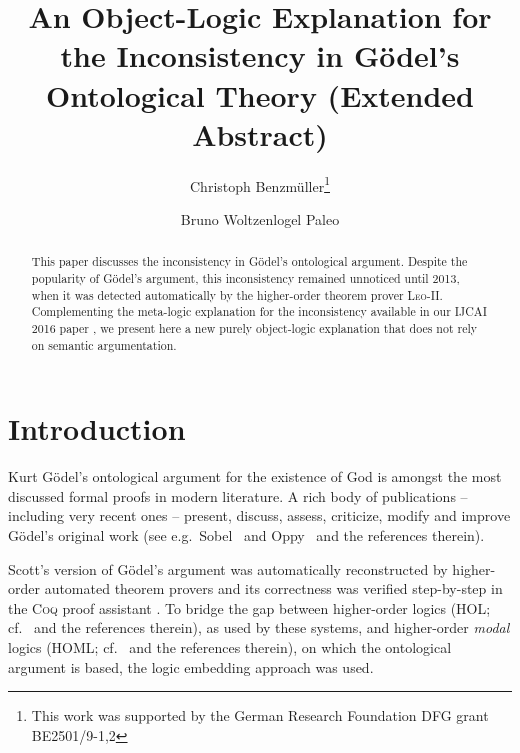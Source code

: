 \documentclass{llncs}
\begin{document}
\title{An Object-Logic Explanation for the Inconsistency in G\"odel's
  Ontological Theory (Extended Abstract)}
\author{Christoph Benzm\"uller\thanks{This work was supported by
    the German Research Foundation DFG grant BE2501/9-1,2} \and Bruno Woltzenlogel Paleo 
}


\maketitle            



\begin{abstract}
  This paper discusses the 
  inconsistency in G\"odel's
  ontological argument. Despite the popularity of G\"odel's argument, this
  inconsistency remained unnoticed until 2013, 
  when it was detected automatically by the 
  higher-order theorem prover \textsc{Leo-II}. Complementing the meta-logic explanation for the inconsistency available in our IJCAI 2016 paper \cite{C55}, we present here a new purely object-logic explanation that does not rely on semantic argumentation.
  
\end{abstract}



\section{Introduction}\label{sec:introduction}
Kurt G\"{o}del's ontological
argument for the existence of God \cite{GoedelNotes,ScottNotes} is
amongst the most discussed formal proofs in modern literature. A rich
body of publications -- including very recent ones -- present,
discuss, assess, criticize, modify and improve G\"{o}del's original
work (see e.g.~Sobel~\cite{sobel2004logic} and Oppy~\cite{sep-ontological-arguments} and the
references therein). 

Scott's version of G\"odel's argument was automatically reconstructed
by higher-order automated theorem provers \cite{C40} and its
correctness was verified step-by-step in the \textsc{Coq} proof
assistant \cite{CSR}. To bridge the gap between higher-order logics
(HOL; cf.~\cite{andrewsSEP} and the references therein), as used by
these systems, and higher-order \emph{modal} logics (HOML;
cf.~\cite{homl} and the references therein), on which the ontological argument is based, the logic embedding approach \cite{J23,C40} was used.
\end{document}
